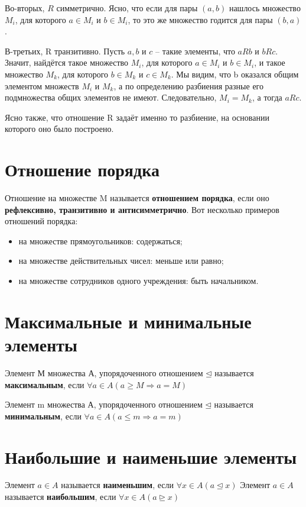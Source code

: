 \documentclass[a4paper]{article}
\begin{document}
{\begin{small}
Во-вторых, $R$ симметрично. Ясно, что если для пары $(a, b)$ нашлось
множество $M_i$, для которого $a \in M_i$ и $b \in M_i$, то это же множество годится для
пары $(b, a)$.

В-третьих, R транзитивно. Пусть $a, b$ и $c$ – такие элементы, что $aRb$ и $bRc$.
Значит, найдётся такое множество $M_i$, для которого $a \in M_i$ и $b \in M_i$, и такое
множество $M_k$, для которого $b \in M_k$ и $c \in M_k$. Мы видим, что b оказался общим
элементом множеств $M_i$ и $M_k$, а по определению разбиения разные его
подмножества общих элементов не имеют. Следовательно, $M_i = M_k$, а тогда $aRc$.

Ясно также, что отношение R задаёт именно то разбиение, на основании
которого оно было построено.

\section*{Отношение порядка}
Отношение на множестве M называется \textbf{отношением
порядка}, если оно \textbf{рефлексивно, транзитивно и антисимметрично}.
Вот несколько примеров отношений порядка:
\begin{itemize}
\item на множестве прямоугольников: содержаться;
\item на множестве действительных чисел: меньше или равно;
\item на множестве сотрудников одного учреждения: быть начальником.
\end{itemize}

\section*{Максимальные и минимальные элементы}
Элемент М множества А, упорядоченного отношением $\unlhd$ называется \textbf{максимальным}, если $\forall a \in A (a \geq M \Rightarrow a = M)$

Элемент m множества А, упорядоченного отношением $\unlhd$ называется \textbf{минимальным}, если $\forall a \in A (a \leq m \Rightarrow a = m)$

\section*{Наибольшие и наименьшие элементы
}
Элемент $a \in A$ называется \textbf{наименьшим}, если $\forall x \in A (a \unlhd x)$\newline
Элемент $a \in A$ называется \textbf{наибольшим}, если $\forall x \in A (a \unrhd x)$


\end{small}}
\end{document}
